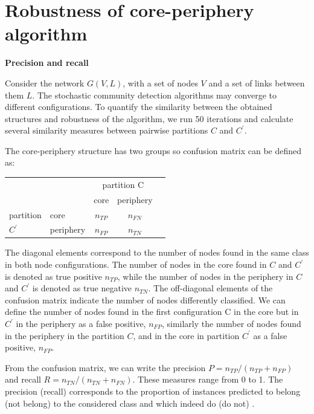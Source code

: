 \chapter{Robustness of core-periphery algorithm} %
\textbf{Precision and recall}

Consider the network $G(V, L)$, with a set of nodes $V$ and a set of links between them $L$. The stochastic community detection algorithms may converge to different configurations. To quantify the similarity between the obtained structures and robustness of the algorithm, we run 50 iterations and calculate several similarity measures between pairwise partitions $C$ and $C^{'}$.

The core-periphery structure has two groups so confusion matrix \cite{labatut2012accuracy} can be defined as:

\begin{center}
	
	\begin{tabular}{l|l|c|c|c} 
		
		\multicolumn{2}{c}{}&\multicolumn{2}{c}{partition C}&\\ 
		
		\cline{3-4} 
		\multicolumn{2}{c|}{}&core&periphery&\multicolumn{1}{c}{}\\
		\cline{2-4} 
		partition & core & $n_{TP}$ & $n_{FN}$ & \\ 
		\cline{2-4} $C^{'}$ & periphery & $n_{FP}$ & $n_{TN}$ & \\ 
		\cline{2-4}
	\end{tabular}
\end{center}

The diagonal elements correspond to the number of nodes found in the same class in both node configurations. The number of nodes in the core found in $C$ and $C^{'}$ is denoted as true positive $n_{TP}$, while the number of nodes in the periphery in $C$ and $C^{'}$ is denoted as true negative $n_{TN}$. The off-diagonal elements of the confusion matrix indicate the number of nodes differently classified. We can define the number of nodes found in the first configuration C in the core but in $C^{'}$ in the periphery as a false positive, $n_{FP}$, similarly the number of nodes found in the periphery in the partition $C$, and in the core in partition $C^{'}$ as a false positive, $n_{FP}$. 

From the confusion matrix, we can write the precision $P =n_{TP}/(n_{TP}+n_{FP})$ and recall $R=n_{TN}/(n_{TN}+n_{FN})$. These measures range from 0 to 1. The precision (recall) corresponds to the proportion of instances predicted to belong (not belong) to the considered class and which indeed do (do not) \cite{labatut2012accuracy}. \\~\\

